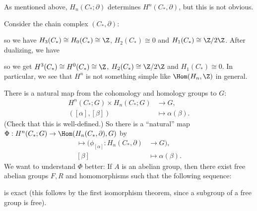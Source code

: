 \begin{remark}
  As mentioned above, $H_n(C_*; \partial)$
  determines $H^n(C_*, \partial)$, but this is not
  obvious.
\end{remark}

\begin{example}
  Consider the chain complex $(C_*, \partial)$:
  \begin{center}
  \end{center}
  so we have $H_3(C_*) \cong H_0(C_*) \cong \Z$,
  $H_2(C_*) \cong 0$ and $H_1(C_*) \cong \Z / 2\Z$.
  After dualizing, we have
  \begin{center}
  \end{center}
  so we get
  $H^3(C_*) \cong H^0(C_*) \cong \Z$,
  $H_2(C_*) \cong \Z / 2\Z$ and $H_1(C_*) \cong 0$.
  In particular, we see that
  $H^n$ is not something simple
  like $\Hom(H_n, \Z)$ in general.
\end{example}

\begin{remark}
  There is a natural map from the cohomology and
  homology groups to $G$:
  \begin{align*}
    H^n(C_*; G) \times H_n(C_*; G) &\longrightarrow G, \\
    ([\alpha], [\beta]) &\longmapsto \alpha(\beta).
  \end{align*}
  (Check that this is well-defined.)
  So there is a ``natural'' map $\Phi : H^n(C_*; G) \to \Hom(H_n(C_*, \partial), G)$ by
  \begin{align*}
    [\alpha] \longmapsto (\phi_{[\alpha]} : H_n(C_*, \partial) &\longrightarrow G), \\
    [\beta] &\longmapsto \alpha(\beta).
  \end{align*}
  We want to understand $\Phi$ better: If
  $A$ is an abelian group, then there exist free
  abelian groups $F, R$ and homomorphisms such that
  the following sequence:
  \begin{center}
  \end{center}
  is exact (this follows by the first isomorphism
  theorem, since a subgroup of a free group is
  free).
\end{remark}


